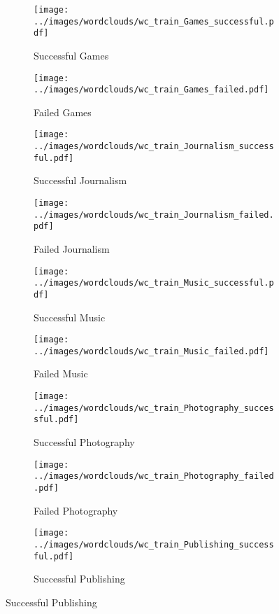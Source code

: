 \documentclass{article}
\begin{document}
{\begin{itemize}
\begin{figure}
\begin{subfigure}[i]{0.2\linewidth}
    \centering\texttt{[image: ../images/wordclouds/wc\_train\_Games\_successful.pdf]}
    \caption{Successful Games}
    \label{fig:Games_s}
  \end{subfigure} 
  \begin{subfigure}[i']{0.2\linewidth}
    \centering\texttt{[image: ../images/wordclouds/wc\_train\_Games\_failed.pdf]}
    \caption{Failed Games}
    \label{fig:Games_f}
  \end{subfigure}
  \begin{subfigure}[j]{0.2\linewidth}
    \centering\texttt{[image: ../images/wordclouds/wc\_train\_Journalism\_successful.pdf]}
    \caption{Successful Journalism}
    \label{fig:Journalism_s}
  \end{subfigure} 
  \begin{subfigure}[j']{0.2\linewidth}
    \centering\texttt{[image: ../images/wordclouds/wc\_train\_Journalism\_failed.pdf]}
    \caption{Failed Journalism}
    \label{fig:Journalism_f}
  \end{subfigure}
  \begin{subfigure}[k]{0.2\linewidth}
    \centering\texttt{[image: ../images/wordclouds/wc\_train\_Music\_successful.pdf]}
    \caption{Successful Music}
    \label{fig:Music_s}
  \end{subfigure} 
  \begin{subfigure}[k']{0.2\linewidth}
    \centering\texttt{[image: ../images/wordclouds/wc\_train\_Music\_failed.pdf]}
    \caption{Failed Music}
    \label{fig:Music_f}
  \end{subfigure}
  \begin{subfigure}[l]{0.2\linewidth}
    \centering\texttt{[image: ../images/wordclouds/wc\_train\_Photography\_successful.pdf]}
    \caption{Successful Photography}
    \label{fig:Photography_s}
  \end{subfigure} 
  \begin{subfigure}[l']{0.2\linewidth}
    \centering\texttt{[image: ../images/wordclouds/wc\_train\_Photography\_failed.pdf]}
    \caption{Failed Photography}
    \label{fig:Photography_f}
  \end{subfigure}
    \begin{subfigure}[m]{0.2\linewidth}
    \centering\texttt{[image: ../images/wordclouds/wc\_train\_Publishing\_successful.pdf]}
    \caption{Successful Publishing}
    \label{fig:Publishing_s}
  \end{subfigure} 

\end{figure}
\end{itemize}}
\end{document}
